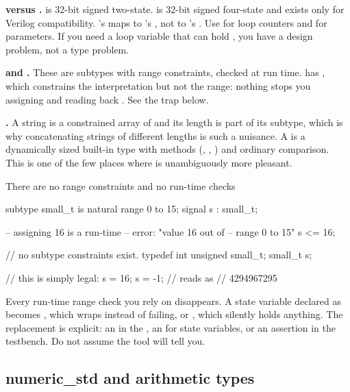 \textbf{ versus .}  is 32-bit signed two-state.
 is 32-bit signed four-state and exists only for Verilog
compatibility. \VHDL{}'s  maps to \SV{}'s , not to
\SV{}'s . Use  for loop counters and for parameters. If you
need a loop variable that can hold , you have a design problem, not a
type problem.

\textbf{ and .} These are \VHDL{} subtypes with
range constraints, checked at run time. \SV{} has , which
constrains the interpretation but not the range: nothing stops you assigning
 and reading back . See the trap below.

\textbf{.} A \VHDL{} string is a constrained array of
 and its length is part of its subtype, which is why
concatenating strings of different lengths is such a nuisance. A \SV{}
 is a dynamically sized built-in type with methods
(, , ) and ordinary \code{==}
comparison. This is one of the few places where \SV{} is unambiguously more
pleasant.

\begin{gotcha}{There are no range constraints and no run-time checks}
\begin{rosetta}
\begin{rleft}
subtype small_t is
  natural range 0 to 15;
signal s : small_t;

-- assigning 16 is a run-time
-- error: "value 16 out of
-- range 0 to 15"
s <= 16;
\end{rleft}
\begin{rright}
// no subtype constraints exist.
typedef int unsigned small_t;
small_t s;

// this is simply legal:
s = 16;
s = -1;      // reads as
             // 4294967295
\end{rright}
\end{rosetta}
Every \VHDL{} run-time range check you rely on disappears. A state variable
declared as  becomes , which
wraps instead of failing, or , which silently holds anything. The
replacement is explicit: an  in the \RTL{}, an
 for state variables, or an assertion in the testbench. Do not
assume the tool will tell you.
\end{gotcha}

\subsection{numeric\_std and arithmetic types}

